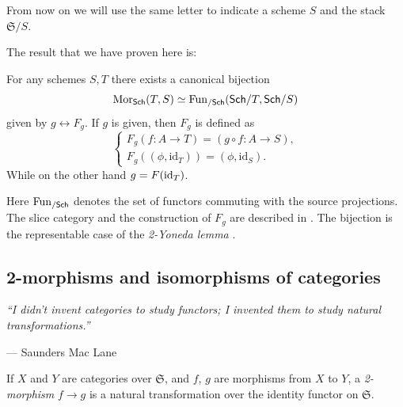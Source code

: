\documentclass[12pt]{memoir}
\begin{document}
From now on we will use the same letter to indicate a scheme $S$ and the stack $\mathfrak{S}/S$. 

\begin{ptcb}
    The result that we have proven here is:
    \begin{nonum-Th}
        For any schemes \(S,T\) there exists a canonical bijection
        \[
            \operatorname{Mor}_{\mathsf{Sch}}(T,S)\simeq\operatorname{Fun}_{/\mathsf{Sch}}(\mathsf{Sch}/T,\mathsf{Sch}/S)
        \]
        given by \(g\leftrightarrow F_g\). If \(g\) is given, then \(F_g\) is defined as
        \[
        \begin{cases}
            F_g(f:A\to T)=(g\circ f:A\to S),\\
            F_g((\phi,\mathrm{id}_T))=(\phi,\mathrm{id}_S).
        \end{cases}
        \]
        While on the other hand \(g=F(\operatorname{id}_T)\).
    \end{nonum-Th}
    Here \(\operatorname{Fun}_{/\mathsf{Sch}}\) denotes the set of functors commuting with the source projections. The slice category and the construction of \(F_g\) are described in \cite{notes:stacks-slice}. The bijection is the representable case of the \emph{2-Yoneda lemma} \cite{notes:stacks-2-yoneda}.
\end{ptcb}

\subsection{2-morphisms and isomorphisms of categories}

\begin{flushright}
\begin{minipage}{0.72\linewidth}
\raggedleft
\itshape
``I didn't invent categories to study functors; I invented them to study natural transformations.''\par
\medskip
{\normalfont\small --- Saunders Mac Lane}
\end{minipage}
\end{flushright}

If $X$ and $Y$ are categories over $\mathfrak{S}$, and $f$, $g$ are morphisms from $X$ to $Y$, a \emph{2-morphism} $f \to g$ is a natural transformation over the identity functor on $\mathfrak{S}$.
\end{document}
